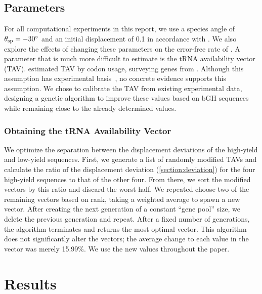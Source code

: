 \documentclass[11pt]{article}
\begin{document}
\subsection{Parameters}
\label{section:parameters}
For all computational experiments in this report, we use a species
angle of $\theta_{\rm{sp}} = -30^\circ$ and an initial displacement of 0.1
in accordance with \citet{lalit:mechanics}.
We also explore the effects of changing these parameters on the
error-free rate of \prfB.
A parameter that is much more difficult to estimate
is the tRNA availability vector (TAV).
\citeauthor{lalit:mechanics} estimated TAV by codon usage, 
surveying genes from \ecoli.
Although this assumption has experimental basis~\cite{ikemura}, 
no concrete evidence supports this assumption.
We chose to calibrate the TAV from existing experimental data, 
designing a genetic algorithm to improve these values based on 
bGH sequences while remaining close 
to the already determined values.

\subsubsection{Obtaining the tRNA Availability Vector}
We optimize the separation between the displacement deviations of the 
high-yield and low-yield sequences. First, we generate a list of 
randomly modified TAVs and calculate the ratio of the 
displacement deviation (\autoref{section:deviation}) for the four 
high-yield sequences to that of the other four. From there, we sort the 
modified vectors by this ratio and discard the worst half.
We repeated choose two of the remaining vectors based on rank, taking a weighted 
average to spawn a new vector.  After creating the 
next generation of a constant ``gene pool'' size, we delete 
the previous generation and repeat. After a fixed number of 
generations, the algorithm terminates and returns the most optimal vector.
This algorithm does not significantly alter the vectors; the average 
change to each value in the vector was merely 15.99\%. We use the new values
throughout the paper.

\section{Results}
\subsection{\prfB}
\end{document}
